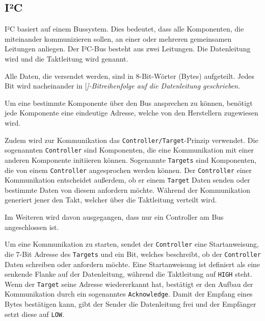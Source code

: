 \subsection{I²C}


I²C basiert auf einem Bussystem.
Dies bedeutet, dass alle Komponenten, die miteinander kommunizieren sollen, an einer oder mehreren gemeinsamen Leitungen anliegen.
Der I²C-Bus besteht aus zwei Leitungen.
Die Datenleitung wird  und die Taktleitung wird  genannt.

Alle Daten, die versendet werden, sind in 8-Bit-Wörter (Bytes) aufgeteilt.
Jedes Bit wird nacheinander in [\itshape]-Bitreihenfolge auf die Datenleitung geschrieben.

Um eine bestimmte Komponente über den Bus ansprechen zu können, benötigt jede Komponente eine eindeutige Adresse, welche von den Herstellern zugewiesen wird.

Zudem wird zur Kommunikation das \texttt{Controller/Target}-Prinzip verwendet.
Die sogenannten \texttt{Controller} sind Komponenten, die eine Kommunikation mit einer anderen Komponente initiieren können.
Sogenannte \texttt{Targets} sind Komponenten, die von einem \texttt{Controller} angesprochen werden können.
Der \texttt{Controller} einer Kommunikation entscheidet außerdem, ob er einem \texttt{Target} Daten senden oder bestimmte Daten von diesem anfordern möchte.
Während der Kommunikation generiert jener den Takt, welcher über die Taktleitung verteilt wird.

Im Weiteren wird davon ausgegangen, dass nur ein Controller am Bus angeschlossen ist.

Um eine Kommunikation zu starten, sendet der \texttt{Controller} eine Startanweisung, die 7-Bit Adresse des \texttt{Targets} und ein Bit, welches beschreibt, ob der \texttt{Controller} Daten schreiben oder anfordern möchte.
Eine Startanweisung ist definiert als eine senkende Flanke auf der Datenleitung, während die Taktleitung auf \texttt{HIGH} steht.
Wenn der \texttt{Target} seine Adresse wiedererkannt hat, bestätigt er den Aufbau der Kommunikation durch ein sogenanntes \texttt{Acknowledge}.
Damit der Empfang eines Bytes bestätigen kann, gibt der Sender die Datenleitung frei und der Empfänger setzt diese auf \texttt{LOW}.
